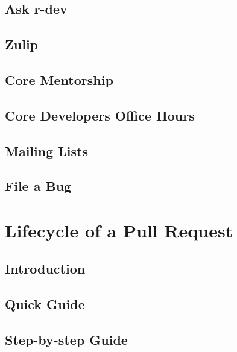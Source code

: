 \documentclass[]{book}
\begin{document}
\hypertarget{ask-r-dev}{%
\section{Ask r-dev}\label{ask-r-dev}}

\hypertarget{zulip}{%
\section{Zulip}\label{zulip}}

\hypertarget{core-mentorship}{%
\section{Core Mentorship}\label{core-mentorship}}

\hypertarget{core-developers-office-hours}{%
\section{Core Developers Office Hours}\label{core-developers-office-hours}}

\hypertarget{mailing-lists}{%
\section{Mailing Lists}\label{mailing-lists}}

\hypertarget{file-a-bug}{%
\section{File a Bug}\label{file-a-bug}}

\hypertarget{lifecycle-of-a-pull-request}{%
\chapter{Lifecycle of a Pull Request}\label{lifecycle-of-a-pull-request}}

\hypertarget{introduction}{%
\section{Introduction}\label{introduction}}

\hypertarget{quick-guide}{%
\section{Quick Guide}\label{quick-guide}}

\hypertarget{step-by-step-guide}{%
\section{Step-by-step Guide}\label{step-by-step-guide}}
\end{document}
